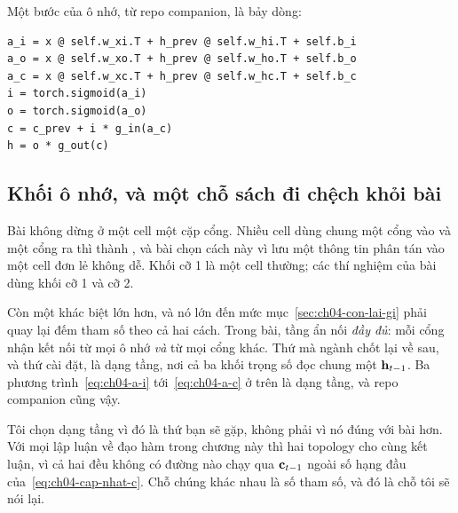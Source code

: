 Một bước của ô nhớ, từ repo companion, là bảy dòng:

\begin{verbatim}
a_i = x @ self.w_xi.T + h_prev @ self.w_hi.T + self.b_i
a_o = x @ self.w_xo.T + h_prev @ self.w_ho.T + self.b_o
a_c = x @ self.w_xc.T + h_prev @ self.w_hc.T + self.b_c
i = torch.sigmoid(a_i)
o = torch.sigmoid(a_o)
c = c_prev + i * g_in(a_c)
h = o * g_out(c)
\end{verbatim}

\subsection*{Khối ô nhớ, và một chỗ sách đi chệch khỏi bài}

%
Bài không dừng ở một cell một cặp cổng. Nhiều cell dùng chung một cổng vào và
một cổng ra thì thành , và bài chọn cách này
vì lưu một thông tin phân tán vào một cell đơn lẻ không dễ. Khối cỡ 1 là một
cell thường; các thí nghiệm của bài dùng khối cỡ 1 và cỡ 2.

Còn một khác biệt lớn hơn, và nó lớn đến mức mục~\ref{sec:ch04-con-lai-gi} phải
quay lại đếm tham số theo cả hai cách. Trong bài, tầng ẩn nối \emph{đầy đủ}:
mỗi cổng nhận kết nối từ mọi ô nhớ \emph{và} từ mọi cổng khác. Thứ mà ngành
chốt lại về sau, và thứ  cài đặt, là dạng tầng, nơi cả ba
khối trọng số đọc chung một \(\mathbf{h}_{t-1}\). Ba
phương trình~\eqref{eq:ch04-a-i} tới~\eqref{eq:ch04-a-c} ở trên là dạng tầng,
và repo companion cũng vậy.

Tôi chọn dạng tầng vì đó là thứ bạn sẽ gặp, không phải vì nó đúng với bài hơn.
Với mọi lập luận về đạo hàm trong chương này thì hai topology cho cùng kết
luận, vì cả hai đều không có đường nào chạy qua \(\mathbf{c}_{t-1}\) ngoài số
hạng đầu của~\eqref{eq:ch04-cap-nhat-c}. Chỗ chúng khác nhau là số tham số, và
đó là chỗ tôi sẽ nói lại.
